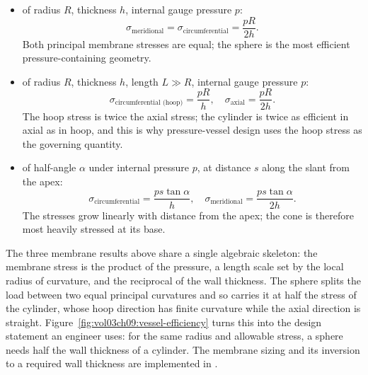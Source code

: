 \begin{itemize}[leftmargin=*]
  \item {} of radius $R$,
    thickness $h$, internal gauge pressure $p$:
    \[
    \sigma_{\text{meridional}} = \sigma_{\text{circumferential}} =
    \frac{pR}{2h}.
    \]
    Both principal membrane stresses are equal; the sphere is the
    most efficient pressure-containing geometry.
  \item {} of radius $R$,
    thickness $h$, length $L \gg R$, internal gauge pressure $p$:
    \[
    \sigma_{\text{circumferential (hoop)}} = \frac{pR}{h}, \quad
    \sigma_{\text{axial}} = \frac{pR}{2h}.
    \]
    The hoop stress is twice the axial stress; the cylinder is
    twice as efficient in axial as in hoop, and this is why
    pressure-vessel design uses the hoop stress as the governing
    quantity.
  \item {} of half-angle $\alpha$ under
    internal pressure $p$, at distance $s$ along the slant from the
    apex:
    \[
    \sigma_{\text{circumferential}} = \frac{p s \tan\alpha}{h},
    \quad \sigma_{\text{meridional}} = \frac{p s \tan\alpha}{2 h}.
    \]
    The stresses grow linearly with distance from the apex; the
    cone is therefore most heavily stressed at its base.
\end{itemize}





The three membrane results above share a single algebraic skeleton:
the membrane stress is the product of the pressure, a length scale set
by the local radius of curvature, and the reciprocal of the wall
thickness. The sphere splits the load between two equal principal
curvatures and so carries it at half the stress of the cylinder, whose
hoop direction has finite curvature while the axial direction is
straight. Figure~\ref{fig:vol03ch09:vessel-efficiency} turns this into
the design statement an engineer uses: for the same radius and
allowable stress, a sphere needs half the wall thickness of a
cylinder. The membrane sizing and its inversion to a required wall
thickness are implemented in .

